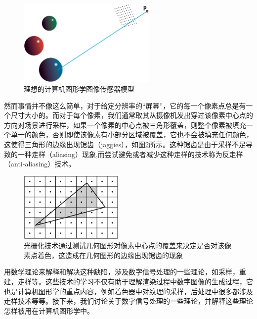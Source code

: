 \begin{figure}
\sidecaption
	\includegraphics[width=0.6\textwidth]{figures/intro/camera}
	\caption{理想的计算机图形学图像传感器模型}
	\label{f:intro-camera}
\end{figure}

然而事情并不像这么简单，对于给定分辨率的“屏幕”，它的每一个像素点总是有一个尺寸大小的。而对于每个像素，我们通常取其从摄像机发出穿过该像素中心点的方向对场景进行采样，如果一个像素的中心点被三角形覆盖，则整个像素被填充一个单一的颜色，否则即使该像素有小部分区域被覆盖，它也不会被填充任何颜色，这使得三角形的边缘出现锯齿（jaggies），如图\ref{f:intro-aliasing-triangle}所示。这种锯齿是由于采样不足导致的一种走样（aliasing）现象,而尝试避免或者减少这种走样的技术称为反走样（anti-aliasing）技术。

\begin{figure}
\sidecaption
	\includegraphics[width=0.45\textwidth]{figures/intro/aliasing-triangle}
	\caption{光栅化技术通过测试几何图形对像素中心点的覆盖来决定是否对该像素点着色，这造成在几何图形的边缘出现锯齿的现象}
	\label{f:intro-aliasing-triangle}
\end{figure}

用数学理论来解释和解决这种缺陷，涉及数字信号处理的一些理论，如采样，重建，走样等。这些技术的学习不仅有助于理解渲染过程中数字图像的生成过程，它也是计算机图形学的重点内容，例如着色器中对纹理的采样，后处理中很多都涉及走样技术等等。接下来，我们讨论关于数字信号处理的一些理论，并解释这些理论怎样被用在计算机图形学中。






